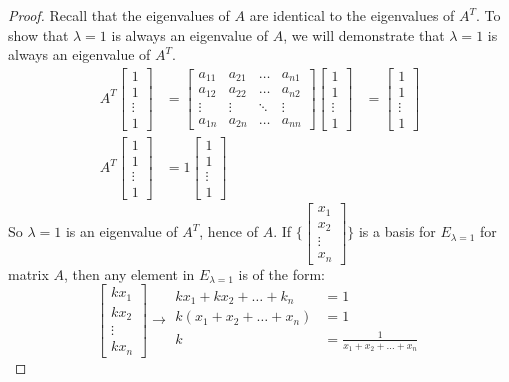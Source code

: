 \documentclass[12pt]{article}
\begin{document}
\begin{proof} Recall that the eigenvalues of $A$ are identical to the eigenvalues of $A^T$. To show that $\lambda = 1$ is always an eigenvalue of $A$, we will demonstrate that $\lambda = 1$ is always an eigenvalue of $A^T$. $$\begin{aligned} A^T\begin{bmatrix} 1 \\ 1 \\ \vdots \\ 1 \end{bmatrix} &= \begin{bmatrix} a_{11} & a_{21} & \dots & a_{n1} \\ a_{12} & a_{22} & \dots & a_{n2} \\ \vdots & \vdots & \ddots & \vdots \\ a_{1n} & a_{2n} & \dots & a_{nn} \end{bmatrix}\begin{bmatrix} 1 \\ 1 \\ \vdots \\ 1 \end{bmatrix} &= \begin{bmatrix} 1 \\ 1 \\ \vdots \\ 1 \end{bmatrix} \\ A^T\begin{bmatrix} 1 \\ 1 \\ \vdots \\ 1 \end{bmatrix} &= 1\begin{bmatrix} 1 \\ 1 \\ \vdots \\ 1 \end{bmatrix} \end{aligned} $$ 
So $\lambda = 1$ is an eigenvalue of $A^T$, hence of $A$. If $\{\begin{bmatrix} x_1 \\ x_2 \\ \vdots \\ x_n \end{bmatrix}\}$ is a basis for $E_{\lambda = 1}$ for matrix $A$, then any element in $E_{\lambda = 1}$ is of the form: $$\begin{bmatrix} kx_1 \\ kx_2 \\ \vdots \\ kx_n \end{bmatrix} \rightarrow \begin{aligned} kx_1 + kx_2 + \dots + k_n &= 1 \\ k(x_1 + x_2 + \dots + x_n) &= 1 \\ k &= \frac{1}{x_1 + x_2 + \dots + x_n} \end{aligned} $$ \end{proof} 
\end{document}
